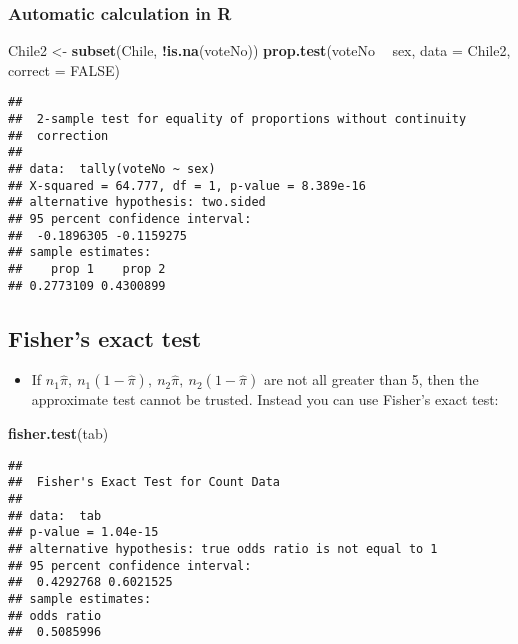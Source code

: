 \documentclass[]{article}
\newenvironment{Shaded}{\begin{snugshade}}{\end{snugshade}}
\newcommand{\KeywordTok}[1]{\textcolor[rgb]{0.13,0.29,0.53}{\textbf{#1}}}
\newcommand{\DataTypeTok}[1]{\textcolor[rgb]{0.13,0.29,0.53}{#1}}
\newcommand{\StringTok}[1]{\textcolor[rgb]{0.31,0.60,0.02}{#1}}
\newcommand{\OtherTok}[1]{\textcolor[rgb]{0.56,0.35,0.01}{#1}}
\newcommand{\OperatorTok}[1]{\textcolor[rgb]{0.81,0.36,0.00}{\textbf{#1}}}
\newcommand{\NormalTok}[1]{#1}
\providecommand{\tightlist}{%
  \setlength{\itemsep}{0pt}\setlength{\parskip}{0pt}}
\begin{document}
\subsubsection{\texorpdfstring{Automatic calculation in
\textbf{R}}{Automatic calculation in R}}\label{automatic-calculation-in-r}

\begin{Shaded}
\begin{Highlighting}[]
\NormalTok{Chile2 <-}\StringTok{ }\KeywordTok{subset}\NormalTok{(Chile, }\OperatorTok{!}\KeywordTok{is.na}\NormalTok{(voteNo))}
\KeywordTok{prop.test}\NormalTok{(voteNo }\OperatorTok{~}\StringTok{ }\NormalTok{sex, }\DataTypeTok{data =}\NormalTok{ Chile2, }\DataTypeTok{correct =} \OtherTok{FALSE}\NormalTok{)}
\end{Highlighting}
\end{Shaded}

\begin{verbatim}
## 
##  2-sample test for equality of proportions without continuity
##  correction
## 
## data:  tally(voteNo ~ sex)
## X-squared = 64.777, df = 1, p-value = 8.389e-16
## alternative hypothesis: two.sided
## 95 percent confidence interval:
##  -0.1896305 -0.1159275
## sample estimates:
##    prop 1    prop 2 
## 0.2773109 0.4300899
\end{verbatim}

\subsection{Fisher's exact test}\label{fishers-exact-test}

\begin{itemize}
\tightlist
\item
  If
  \(n_1\hat{\pi},\ n_1(1-\hat{\pi}),\ n_2\hat{\pi},\ n_2(1-\hat{\pi})\)
  are not all greater than 5, then the approximate test cannot be
  trusted. Instead you can use Fisher's exact test:
\end{itemize}

\begin{Shaded}
\begin{Highlighting}[]
\KeywordTok{fisher.test}\NormalTok{(tab)}
\end{Highlighting}
\end{Shaded}

\begin{verbatim}
## 
##  Fisher's Exact Test for Count Data
## 
## data:  tab
## p-value = 1.04e-15
## alternative hypothesis: true odds ratio is not equal to 1
## 95 percent confidence interval:
##  0.4292768 0.6021525
## sample estimates:
## odds ratio 
##  0.5085996
\end{verbatim}
\end{document}
